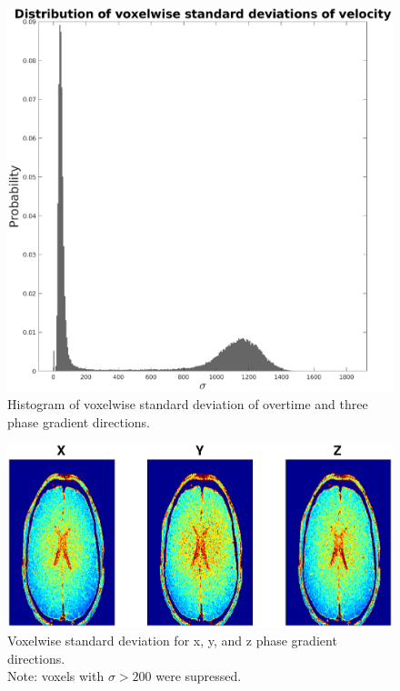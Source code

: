 \begin{figure}
  \centering
  \includegraphics[scale = .45]{Figures/hist_vxl_sd_venc4.eps}
    \caption{Histogram of voxelwise standard deviation of overtime and three phase gradient directions.}
  \label{fig:sdhist}
\end{figure}

\begin{figure}
  \centering
  \includegraphics[scale = .6]{Figures/vxl_sd200_venc4.eps}
    \caption{Voxelwise standard deviation for x, y, and z phase gradient directions. \\ Note: voxels with $\sigma > 200$ were supressed.}
  \label{fig:sdflow}
\end{figure}

